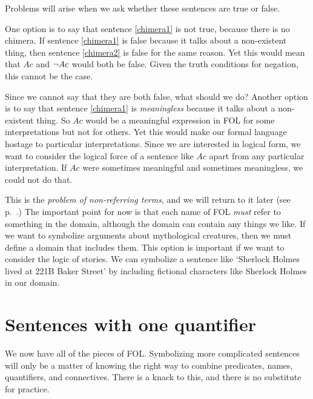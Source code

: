 Problems will arise when we ask whether these sentences are true or false.

One option is to say that sentence \ref{chimera1} is not true, because there is no chimera. If sentence \ref{chimera1} is false because it talks about a non-existent thing, then sentence \ref{chimera2} is false for the same reason. Yet this would mean that $Ac$ and $\neg Ac$ would both be false. Given the truth conditions for negation, this cannot be the case.

Since we cannot say that they are both false, what should we do? Another option is to say that sentence \ref{chimera1} is \emph{meaningless} because it talks about a non-existent thing. So $Ac$ would be a meaningful expression in FOL for some interpretations but not for others. Yet this would make our formal language hostage to particular interpretations. Since we are interested in logical form, we want to consider the logical force of a sentence like $Ac$ apart from any particular interpretation. If $Ac$ were sometimes meaningful and sometimes meaningless, we could not do that.

This is the \emph{problem of non-referring terms}, and we will return to it later (see p.~\pageref{subsec.defdesc}.) The important point for now is that each name of FOL \emph{must} refer to something in the domain, although the domain can contain any things we like. If we want to symbolize arguments about mythological creatures, then we must define a domain that includes them. This option is important if we want to consider the logic of stories. We can symbolize a sentence like `Sherlock Holmes lived at 221B Baker Street' by including fictional characters like Sherlock Holmes in our domain.

\chapter{Sentences with one quantifier}
\label{s:MoreMonadic}

We now have all of the pieces of FOL. Symbolizing more complicated sentences will only be a matter of knowing the right way to combine predicates, names, quantifiers, and connectives. There is a knack to this, and there is no substitute for practice.


